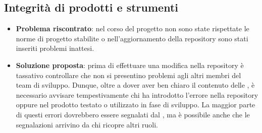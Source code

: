		\subsection{Integrità di prodotti e strumenti}
			\begin{itemize}
				\item \textbf{Problema riscontrato}: nel corso del progetto non sono state rispettate le norme di progetto stabilite o nell'aggiornamento della repository sono stati inseriti problemi inattesi.
				\item \textbf{Soluzione proposta}: prima di effettuare una modifica nella repository è tassativo controllare che non si presentino problemi agli altri membri del team di sviluppo. Dunque, oltre a dover aver ben chiaro il contenuto delle \NdP, è necessario avvisare tempestivamente chi ha introdotto l'errore nella repository oppure nel prodotto testato o utilizzato in fase di sviluppo. La maggior parte di questi errori dovrebbero essere segnalati dal \Ver, ma è possibile anche che le segnalazioni arrivino da chi ricopre altri ruoli.
			\end{itemize}
		
		
		
